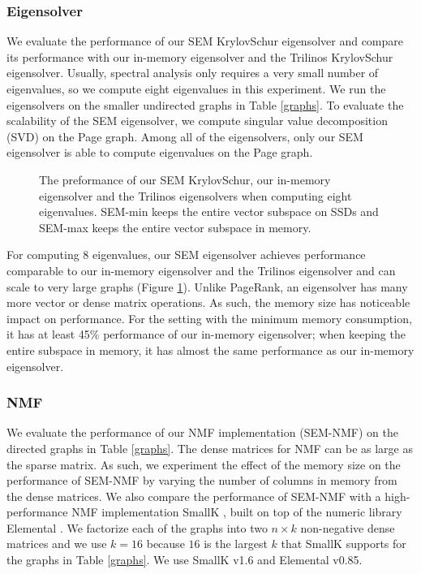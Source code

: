 \subsubsection{Eigensolver}

We evaluate the performance of our SEM KrylovSchur eigensolver and compare
its performance
with our in-memory eigensolver and the Trilinos KrylovSchur eigensolver.
Usually, spectral analysis only requires a very small number of
eigenvalues, so we compute eight eigenvalues in this experiment. We run
the eigensolvers on the smaller undirected graphs
in Table \ref{graphs}. To evaluate the scalability of the SEM eigensolver,
we compute singular value decomposition (SVD) on the Page graph. Among all of
the eigensolvers, only our SEM eigensolver is able to compute eigenvalues
on the Page graph.

\begin{figure}
	\begin{center}
		\footnotesize
		
		\caption{The preformance of our SEM KrylovSchur, our in-memory eigensolver
			and the Trilinos eigensolvers when computing eight
			eigenvalues. SEM-min keeps the entire vector subspace on SSDs and
		SEM-max keeps the entire vector subspace in memory.}
		\label{fig:eigen}
	\end{center}
\end{figure}

For computing 8 eigenvalues, our SEM eigensolver achieves performance
comparable to our in-memory eigensolver and the Trilinos eigensolver
and can scale to very large graphs (Figure \ref{fig:eigen}).
Unlike PageRank, an eigensolver has many more vector or dense matrix operations.
As such, the memory size has noticeable impact on performance.
For the setting with the minimum memory consumption, it has at least 45\%
performance of our in-memory eigensolver; when keeping the entire subspace
in memory, it has almost the same performance as our in-memory eigensolver.

\subsubsection{NMF}
We evaluate the performance of our NMF implementation (SEM-NMF) on the directed
graphs in Table \ref{graphs}. The dense matrices for NMF can be as large as
the sparse matrix. As such, we experiment the effect of the memory size on
the performance of SEM-NMF by varying the number of columns in memory from
the dense matrices. We also compare the performance of SEM-NMF with
a high-performance NMF implementation SmallK \cite{SmallK}, built on top of
the numeric library Elemental \cite{elemental}. We factorize
each of the graphs into two $n \times k$ non-negative dense matrices and
we use $k=16$ because $16$ is the largest $k$ that SmallK supports for
the graphs in Table \ref{graphs}. We use SmallK v1.6 and Elemental v0.85.

